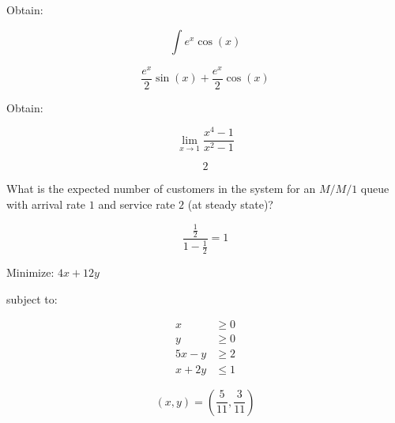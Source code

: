 \documentclass{article}
\begin{document}
\hrulefill
\begin{multicols}{2}

    Obtain:

    \[
        \int{e^{x}\cos(x)}
    \]

    \columnbreak

    \begin{flushright}
        \[\frac{e^{x}}{2} \sin{\left (x \right )} + \frac{e^{x}}{2} \cos{\left
    (x \right )}\]
    \end{flushright}

\end{multicols}

\hrulefill
\begin{multicols}{2}

    Obtain:

    \[
        \lim_{x\to 1}\frac{x ^ 4 - 1}{x ^ 2 - 1}
    \]

    \columnbreak

    \begin{flushright}
    \[
        2
    \]
    \end{flushright}

\end{multicols}


\hrulefill
\begin{multicols}{2}

    What is the expected number of customers in the system for an \(M/M/1\) queue with arrival rate
    \(1\)
    and service rate \(2\) (at steady state)?

    \columnbreak

    \[
        \frac{\frac{1}{2}}{1 - \frac{1}{2}} = 1
    \]

\end{multicols}



\hrulefill
\begin{multicols}{2}

    Minimize: \(4x + 12 y\)

    subject to:

    \begin{align*}
        x & \geq 0\\
        y & \geq 0\\
        5 x - y &\geq 2\\
        x + 2y &\leq 1
    \end{align*}
    

    \columnbreak

    \[
        (x, y) = \left(\frac{5}{11}, \frac{3}{11}\right)
    \]

\end{multicols}
\end{document}
